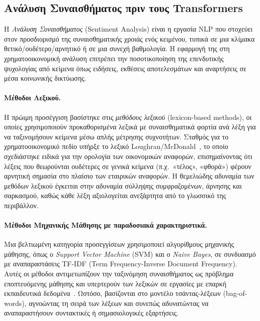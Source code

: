 \subsection{Ανάλυση Συναισθήματος πριν τους Transformers}
\label{subsec:sentiment-lexicon}

Η \emph{Ανάλυση Συναισθήματος} (Sentiment Analysis) είναι η εργασία NLP που
στοχεύει στον προσδιορισμό της συναισθηματικής χροιάς ενός κειμένου, τυπικά σε
μια κλίμακα θετικό/ουδέτερο/αρνητικό ή σε μια συνεχή βαθμολογία. Η
εφαρμογή της στη χρηματοοικονομική ανάλυση επιτρέπει την ποσοτικοποίηση της
επενδυτικής ψυχολογίας από κείμενα όπως ειδήσεις, εκθέσεις αποτελεσμάτων και
αναρτήσεις σε μέσα κοινωνικής δικτύωσης.

\paragraph{Μέθοδοι Λεξικού.}
Η πρώιμη προσέγγιση βασίστηκε στις \emph{μεθόδους λεξικού} (lexicon-based
methods), οι οποίες χρησιμοποιούν προκαθορισμένα λεξικά με
συναισθηματικά φορτία ανά λέξη για να ταξινομήσουν κείμενα μέσω απλής
μέτρησης συχνοτήτων. Σταθμός για το χρηματοοικονομικό πεδίο υπήρξε το λεξικό
Loughran/McDonald~\cite{loughran2011}, το οποίο σχεδιάστηκε ειδικά για την
ορολογία των οικονομικών αναφορών, επισημαίνοντας ότι λέξεις που θεωρούνται
ουδέτερες σε γενικά κείμενα (π.χ.\ «τέλος», «φθορά») φέρουν αρνητική σημασία
στο πλαίσιο των εταιρικών αναφορών. Η θεμελιώδης αδυναμία των μεθόδων λεξικού
έγκειται στην αδυναμία σύλληψης συμφραζομένων, άρνησης και σαρκασμού, καθώς
κάθε λέξη αξιολογείται ανεξάρτητα από το γλωσσικό της περιβάλλον.

\paragraph{Μέθοδοι Μηχανικής Μάθησης με παραδοσιακά χαρακτηριστικά.}
Μια βελτιωμένη κατηγορία προσεγγίσεων χρησιμοποιεί αλγορίθμους μηχανικής
μάθησης, όπως ο \emph{Support Vector Machine} (SVM) και ο \emph{Naive Bayes},
σε συνδυασμό με αναπαραστάσεις TF-IDF (Term Frequency-Inverse Document
Frequency). Αυτές οι μέθοδοι αντιμετωπίζουν την ταξινόμηση συναισθήματος ως
πρόβλημα εποπτευόμενης μάθησης και υπερτερούν των λεξικών σε εργασίες με
επαρκή εκπαιδευτικά δεδομένα~\cite{pang2002sentiment}. Ωστόσο, βασίζονται στο μοντέλο τσάντας-λέξεων
(bag-of-words), αγνοώντας τη σειρά των λέξεων και συνεπώς αδυνατώντας να
αναπαραστήσουν συντακτικές ή σημασιολογικές εξαρτήσεις.

